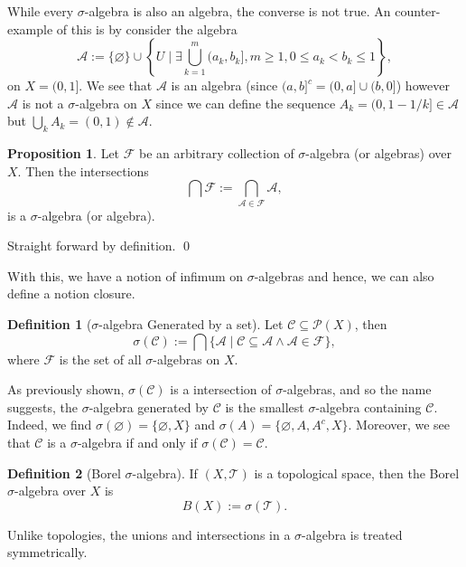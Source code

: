 \documentclass[
]{article}
\theoremstyle{definition}
\newtheorem{prop}{Proposition}
\theoremstyle{definition}
\newtheorem{definition}{Definition}[section]
\begin{document}
While every \(\sigma\)-algebra is also an algebra, the converse is not
true. An counter-example of this is by consider the algebra
\[\mathcal{A} := \{\varnothing\} \cup \left\{ U \mid \exists \bigcup_{k = 1}^m (a_k, b_k], 
  m \ge 1, 0 \le a_k < b_k \le 1 \right\},\] on \(X = (0, 1]\). We see
that \(\mathcal{A}\) is an algebra (since
\((a, b]^c = (0, a] \cup (b, 0]\)) however \(\mathcal{A}\) is not a
\(\sigma\)-algebra on \(X\) since we can define the sequence
\(A_k = (0, 1 - 1 / k] \in \mathcal{A}\) but
\(\bigcup_k A_k = (0, 1) \not\in \mathcal{A}\).

\begin{prop}
  Let \(\mathcal{F}\) be an arbitrary collection of \(\sigma\)-algebra (or algebras) 
  over \(X\). Then the intersections 
  \[\bigcap \mathcal{F} := \bigcap_{\mathcal{A} \in \mathcal{F}} \mathcal{A},\]
  is a \(\sigma\)-algebra (or algebra).
\end{prop}
\proof

Straight forward by definition. \qed

With this, we have a notion of infimum on \(\sigma\)-algebras and hence,
we can also define a notion closure.

\begin{definition}[\(\sigma\)-algebra Generated by a set]
  Let \(\mathcal{C} \subseteq \mathcal{P}(X)\), then 
  \[\sigma(\mathcal{C}) := \bigcap \{\mathcal{A} \mid \mathcal{C} \subseteq \mathcal{A} 
    \wedge \mathcal{A} \in \mathcal{F}\},\]
  where \(\mathcal{F}\) is the set of all \(\sigma\)-algebras on \(X\).
\end{definition}

As previously shown, \(\sigma(\mathcal{C})\) is a intersection of
\(\sigma\)-algebras, and so the name suggests, the \(\sigma\)-algebra
generated by \(\mathcal{C}\) is the smallest \(\sigma\)-algebra
containing \(\mathcal{C}\). Indeed, we find
\(\sigma(\varnothing) = \{\varnothing, X\}\) and
\(\sigma(A) = \{\varnothing, A, A^c, X\}\). Moreover, we see that
\(\mathcal{C}\) is a \(\sigma\)-algebra if and only if
\(\sigma(\mathcal{C}) = \mathcal{C}\).

\begin{definition}[Borel \(\sigma\)-algebra]
  If \((X, \mathcal{T})\) is a topological space, then the Borel \(\sigma\)-algebra 
  over \(X\) is 
  \[B(X) := \sigma(\mathcal{T}).\]
\end{definition}

Unlike topologies, the unions and intersections in a \(\sigma\)-algebra
is treated symmetrically.
\end{document}
